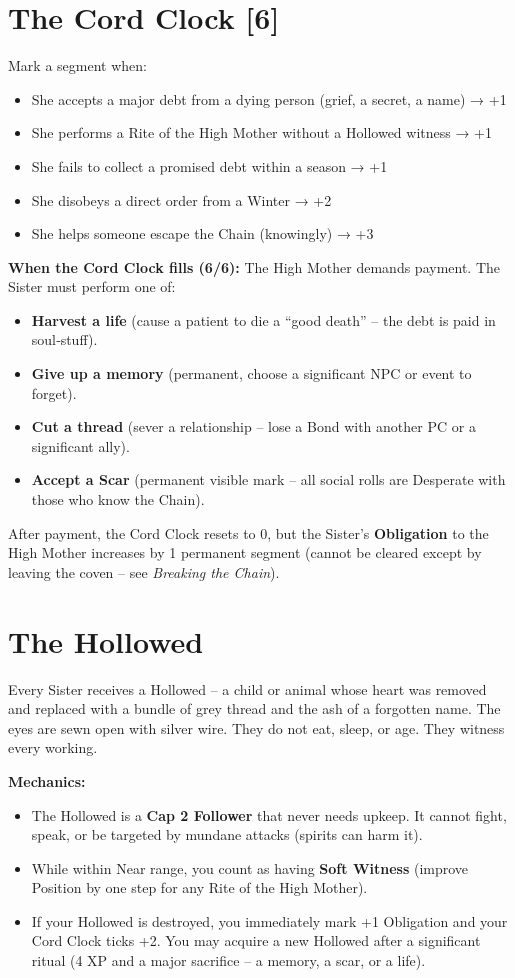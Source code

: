 \documentclass[10pt,twoside]{book}
\begin{document}
\section{The Cord Clock [6]}
Mark a segment when:
\begin{itemize}
\item She accepts a major debt from a dying person (grief, a secret, a name) → +1
\item She performs a Rite of the High Mother without a Hollowed witness → +1
\item She fails to collect a promised debt within a season → +1
\item She disobeys a direct order from a Winter → +2
\item She helps someone escape the Chain (knowingly) → +3
\end{itemize}

\noindent\textbf{When the Cord Clock fills (6/6):} The High Mother demands payment. The Sister must perform one of:
\begin{itemize}
\item \textbf{Harvest a life} (cause a patient to die a “good death” – the debt is paid in soul‑stuff).
\item \textbf{Give up a memory} (permanent, choose a significant NPC or event to forget).
\item \textbf{Cut a thread} (sever a relationship – lose a Bond with another PC or a significant ally).
\item \textbf{Accept a Scar} (permanent visible mark – all social rolls are Desperate with those who know the Chain).
\end{itemize}
After payment, the Cord Clock resets to 0, but the Sister's \textbf{Obligation} to the High Mother increases by 1 permanent segment (cannot be cleared except by leaving the coven – see \textit{Breaking the Chain}).

\section{The Hollowed}
Every Sister receives a Hollowed – a child or animal whose heart was removed and replaced with a bundle of grey thread and the ash of a forgotten name. The eyes are sewn open with silver wire. They do not eat, sleep, or age. They witness every working.

\noindent\textbf{Mechanics:}
\begin{itemize}
\item The Hollowed is a \textbf{Cap 2 Follower} that never needs upkeep. It cannot fight, speak, or be targeted by mundane attacks (spirits can harm it).
\item While within Near range, you count as having \textbf{Soft Witness} (improve Position by one step for any Rite of the High Mother).
\item If your Hollowed is destroyed, you immediately mark +1 Obligation and your Cord Clock ticks +2. You may acquire a new Hollowed after a significant ritual (4 XP and a major sacrifice – a memory, a scar, or a life).
\end{itemize}
\end{document}
